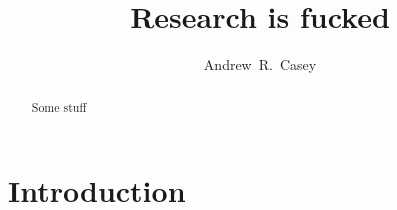 \documentclass[preprint]{aastex}
\begin{document}
\title{Research is fucked}

\author{
  Andrew~R.~Casey
}


\begin{abstract}
  Some stuff
\end{abstract}


\keywords{}


\section{Introduction} 
\label{sec:introduction}
\end{document}
